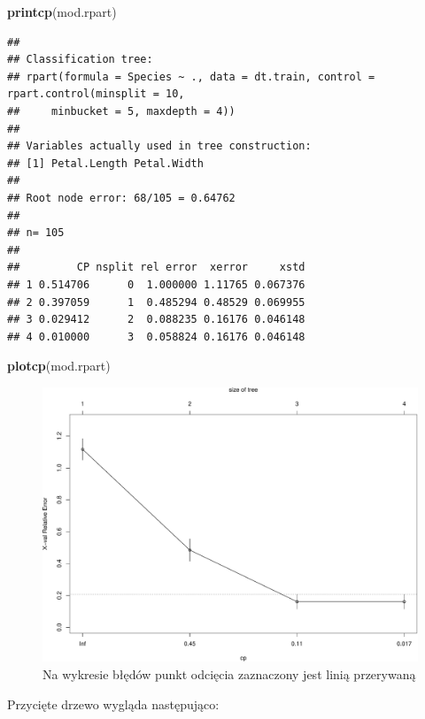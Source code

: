 \documentclass[
]{book}
\newenvironment{Shaded}{\begin{snugshade}}{\end{snugshade}}
\newcommand{\FunctionTok}[1]{\textcolor[rgb]{0.13,0.29,0.53}{\textbf{#1}}}
\newcommand{\NormalTok}[1]{#1}
\theoremstyle{plain}
\theoremstyle{definition}
\theoremstyle{definition}
\theoremstyle{definition}
\theoremstyle{definition}
\theoremstyle{definition}
\theoremstyle{remark}
\begin{document}
\begin{Shaded}
\begin{Highlighting}[]
\FunctionTok{printcp}\NormalTok{(mod.rpart)}
\end{Highlighting}
\end{Shaded}

\begin{verbatim}
## 
## Classification tree:
## rpart(formula = Species ~ ., data = dt.train, control = rpart.control(minsplit = 10, 
##     minbucket = 5, maxdepth = 4))
## 
## Variables actually used in tree construction:
## [1] Petal.Length Petal.Width 
## 
## Root node error: 68/105 = 0.64762
## 
## n= 105 
## 
##         CP nsplit rel error  xerror     xstd
## 1 0.514706      0  1.000000 1.11765 0.067376
## 2 0.397059      1  0.485294 0.48529 0.069955
## 3 0.029412      2  0.088235 0.16176 0.046148
## 4 0.010000      3  0.058824 0.16176 0.046148
\end{verbatim}

\begin{Shaded}
\begin{Highlighting}[]
\FunctionTok{plotcp}\NormalTok{(mod.rpart)}
\end{Highlighting}
\end{Shaded}

\begin{figure}
\centering
\includegraphics{EksploracjaDanych_files/figure-latex/unnamed-chunk-17-1.pdf}
\caption{\label{fig:unnamed-chunk-17}Na wykresie błędów punkt odcięcia zaznaczony jest linią przerywaną}
\end{figure}

Przycięte drzewo wygląda następująco:
\end{document}
